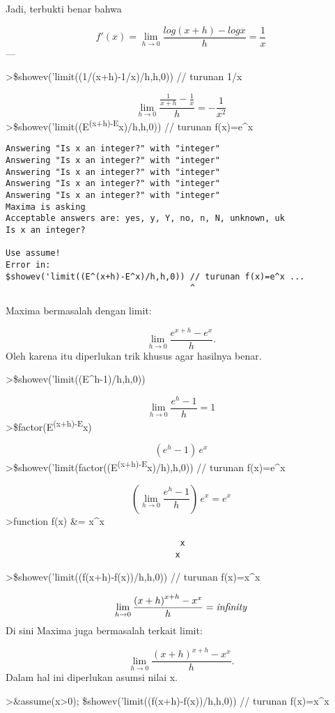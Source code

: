 \documentclass[
]{book}
\begin{document}
Jadi, terbukti benar bahwa

\[f'(x) = \lim_{h\to 0} \frac{log(x+h)-log x}{h} = \frac{1}{x}\]---

\textgreater\$showev('limit((1/(x+h)-1/x)/h,h,0)) // turunan 1/x

\[\lim_{h\rightarrow 0}{\frac{\frac{1}{x+h}-\frac{1}{x}}{h}}=-\frac{1
 }{x^2}\]\textgreater\$showev('limit((E\textsuperscript{(x+h)-E}x)/h,h,0)) // turunan f(x)=e\^{}x

\begin{verbatim}
Answering "Is x an integer?" with "integer"
Answering "Is x an integer?" with "integer"
Answering "Is x an integer?" with "integer"
Answering "Is x an integer?" with "integer"
Answering "Is x an integer?" with "integer"
Maxima is asking
Acceptable answers are: yes, y, Y, no, n, N, unknown, uk
Is x an integer?

Use assume!
Error in:
$showev('limit((E^(x+h)-E^x)/h,h,0)) // turunan f(x)=e^x ...
                                     ^
\end{verbatim}

Maxima bermasalah dengan limit:

\[\lim_{h\to 0}\frac{e^{x+h}-e^x}{h}.\]Oleh karena itu diperlukan trik khusus agar hasilnya benar.

\textgreater\$showev('limit((E\^{}h-1)/h,h,0))

\[\lim_{h\rightarrow 0}{\frac{e^{h}-1}{h}}=1\]\textgreater\$factor(E\textsuperscript{(x+h)-E}x)

\[\left(e^{h}-1\right)\,e^{x}\]\textgreater\$showev('limit(factor((E\textsuperscript{(x+h)-E}x)/h),h,0)) // turunan f(x)=e\^{}x

\[\left(\lim_{h\rightarrow 0}{\frac{e^{h}-1}{h}}\right)\,e^{x}=e^{x}\]\textgreater function f(x) \&= x\^{}x

\begin{verbatim}
                                   x
                                  x
\end{verbatim}

\textgreater\$showev('limit((f(x+h)-f(x))/h,h,0)) // turunan f(x)=x\^{}x

\[\lim_{h\rightarrow 0}{\frac{\left(x+h\right)^{x+h}-x^{x}}{h}}=
 {\it infinity}\]Di sini Maxima juga bermasalah terkait limit:

\[\lim_{h\to 0} \frac{(x+h)^{x+h}-x^x}{h}.\]Dalam hal ini diperlukan asumsi nilai x.

\textgreater\&assume(x\textgreater0); \$showev('limit((f(x+h)-f(x))/h,h,0)) // turunan f(x)=x\^{}x
\end{document}
